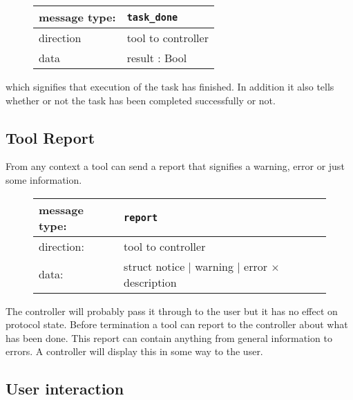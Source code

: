 \documentclass{article}
\newcommand{\msg}[1]{\texttt{#1}}
\begin{document}
   \begin{figure}[H]
    \begin{center}
     \begin{tabular}{|ll|}
      \hline
       message type:   & \msg{task\_done} \\
      \hline
       direction       & tool to controller \\
       data            & result : Bool \\
      \hline
     \end{tabular}
    \end{center}
   \end{figure}

   \noindent which signifies that execution of the task has finished. In addition it also
   tells whether or not the task has been completed successfully or not.

  \subsection{Tool Report}

   From any context a tool can send a report that signifies a warning, error or
   just some information.

   \begin{figure}[H]
    \begin{center}
     \begin{tabular}{|ll|}
      \hline
       message type:   & \msg{report} \\
      \hline
       direction:      & tool to controller \\
       data:           & struct notice $|$ warning $|$ error $\times$ description \\
      \hline
     \end{tabular}
    \end{center}
   \end{figure}

   \noindent The controller will probably pass it through to the user but
   it has no effect on protocol state. Before termination a tool can report to
   the controller about what has been done. This report can contain anything
   from general information to errors. A controller will display this in some
   way to the user.

  \subsection{User interaction} \label{ss:user_interaction}
\end{document}
